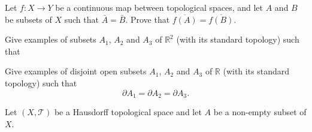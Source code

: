 \documentclass[answers]{exam}
\begin{document}
\begin{questions}



\question%
Let $f: X \to Y$ be a continuous map between topological spaces, and let $A$ and $B$ be subsets of $X$ such that $\bar{A}=\bar{B}$. Prove that $\overline{f(A)}=\overline{f(B)}$.



\question%
Give examples of subsets $A_{1}$, $A_{2}$ and $A_{3}$ of $\mathbb{R}^{2}$ (with its standard topology) such that



\question%
Give examples of disjoint open subsets $A_{1}$, $A_{2}$ and $A_{3}$ of $\mathbb{R}$ (with its standard topology) such that \[
	\partial A_{1}=\partial A_{2}=\partial A_{3} .
\]



\question%
Let $(X, \mathcal{T})$ be a Hausdorff topological space and let $A$ be a non-empty subset of $X$.
\end{questions}
\end{document}
